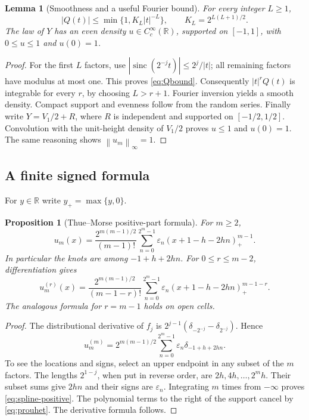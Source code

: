 \documentclass[11pt,a4paper]{article}
\numberwithin{equation}{section}
\newtheorem{proposition}[proposition]{Proposition}
\newtheorem{lemma}[lemma]{Lemma}
\theoremstyle{definition}
\newcommand{\R}{\mathbb R}
\newcommand{\eps}{\varepsilon}
\newcommand{\sinc}{\operatorname{sinc}}
\newcommand{\norm}[1]{\left\lVert #1\right\rVert}
\begin{document}
\begin{lemma}[Smoothness and a useful Fourier bound]\label{lem:decay}
For every integer $L\geq1$,
\begin{equation}
 |Q(t)|\leq\min\{1,K_L|t|^{-L}\},
 \qquad K_L=2^{L(L+1)/2}.
 \label{eq:Qbound}
\end{equation}
The law of $Y$ has an even density $u\in C_c^\infty(\R)$, supported
on $[-1,1]$, with $0\leq u\leq1$ and $u(0)=1$.
\end{lemma}
\begin{proof}
For the first $L$ factors, use
$|\sinc(2^{-j}t)|\leq2^j/|t|$; all remaining factors have modulus
at most one. This proves \eqref{eq:Qbound}. Consequently
$|t|^rQ(t)$ is integrable for every $r$, by choosing $L>r+1$.
Fourier inversion yields a smooth density. Compact support and evenness
follow from the random series. Finally write $Y=V_1/2+R$, where
$R$ is independent and supported on $[-1/2,1/2]$. Convolution with the
unit-height density of $V_1/2$ proves $u\leq1$ and $u(0)=1$.
The same reasoning shows $\norm{u_m}_\infty=1$.
\end{proof}

\subsection{A finite signed formula}

For $y\in\R$ write $y_+=\max\{y,0\}$.
\begin{proposition}[Thue--Morse positive-part formula]\label{prop:positive-part}
For $m\geq2$,
\begin{equation}
 u_m(x)=\frac{2^{m(m-1)/2}}{(m-1)!}
 \sum_{n=0}^{2^m-1}\eps_n
       (x+1-h-2hn)_+^{m-1}.
 \label{eq:spline-positive}
\end{equation}
In particular the knots are among $-1+h+2hn$.
For $0\leq r\leq m-2$, differentiation gives
\begin{equation}
 u_m^{(r)}(x)=\frac{2^{m(m-1)/2}}{(m-1-r)!}
 \sum_{n=0}^{2^m-1}\eps_n
       (x+1-h-2hn)_+^{m-1-r}.
 \label{eq:spline-deriv-positive}
\end{equation}
The analogous formula for $r=m-1$ holds on open cells.
\end{proposition}
\begin{proof}
The distributional derivative of $f_j$ is
$2^{j-1}(\delta_{-2^{-j}}-\delta_{2^{-j}})$. Hence
\begin{equation}
 u_m^{(m)}=2^{m(m-1)/2}
 \sum_{n=0}^{2^m-1}\eps_n\delta_{-1+h+2hn}.
\end{equation}
To see the locations and signs, select an upper endpoint in any subset
of the $m$ factors. The lengths $2^{1-j}$, when put in reverse order,
are $2h,4h,\ldots,2^mh$. Their subset sums give $2hn$ and their signs
are $\eps_n$. Integrating $m$ times from $-\infty$ proves
\eqref{eq:spline-positive}. The polynomial terms to the right of the
support cancel by \eqref{eq:prouhet}. The derivative formula follows.
\end{proof}
\end{document}
